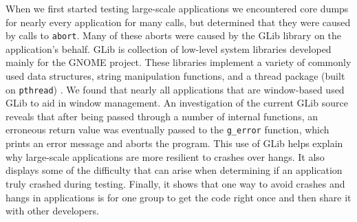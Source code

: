 When we first started testing large-scale applications we encountered core dumps for nearly every application for many calls, but determined that they were caused by calls to \texttt{abort}. Many of these aborts were caused by the GLib library on the application's behalf. GLib is collection of low-level system libraries developed mainly for the GNOME project. These libraries implement a variety of commonly used data structures, string manipulation functions, and a thread package (built on \texttt{pthread}) \cite{glibman}. We found that nearly all applications that are window-based used GLib to aid in window management. An investigation of the current GLib source reveals that after being passed through a number of internal functions, an erroneous return value was eventually passed to the \texttt{g\_error} function, which prints an error message and aborts the program. This use of GLib helps explain why large-scale applications are more resilient to crashes over hangs. It also displays some of the difficulty that can arise when determining if an application truly crashed during testing. Finally, it shows that one way to avoid crashes and hangs in applications is for one group to get the code right once and then share it with other developers.



